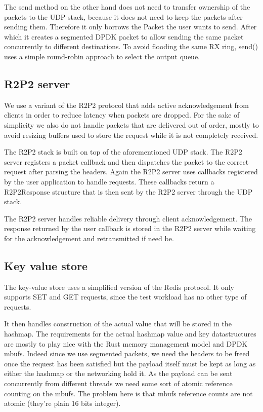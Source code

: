 \documentclass[11pt]{book}
\begin{document}
The send method on the other hand does not need to transfer ownership
of the packets to the UDP stack, because it does not need to keep the
packets after sending them. Therefore it only borrows the Packet the
user wants to send. After which it creates a segmented DPDK packet to
allow sending the same packet concurrently to different destinations.
To avoid flooding the same RX ring, send() uses a simple round-robin
approach to select the output queue.

\subsection{R2P2 server} 

We use a variant of the R2P2 protocol that adds active acknowledgement
from clients in order to reduce latency when packets are dropped. For
the sake of simplicity we also do not handle packets that are
delivered out of order, mostly to avoid resizing buffers used to store
the request while it is not completely received.

The R2P2 stack is built on top of the aforementioned UDP stack. The
R2P2 server registers a packet callback and then dispatches the packet
to the correct request after parsing the headers. Again the R2P2
server uses callbacks registered by the user application to handle
requests. These callbacks return a R2P2Response structure that is then
sent by the R2P2 server through the UDP stack.

The R2P2 server handles reliable delivery through client
acknowledgement. The response returned by the user callback is stored
in the R2P2 server while waiting for the acknowledgement and
retransmitted if need be.

\subsection{Key value store}

The key-value store uses a simplified version of the Redis
protocol. It only supports SET and GET requests, since the test
workload has no other type of requests.


It then handles construction of the actual value that will be stored
in the hashmap. The requirements for the actual hashmap value and key
datastructures are mostly to play nice with the Rust memory management
model and DPDK mbufs. Indeed since we use segmented packets, we need
the headers to be freed once the request has been satisfied but the
payload itself must be kept as long as either the hashmap or the
networking hold it. As the payload can be sent concurrently from
different threads we need some sort of atomic reference counting on
the mbufs. The problem here is that mbufs reference counts are not
atomic (they're plain 16 bits integer).
\end{document}
